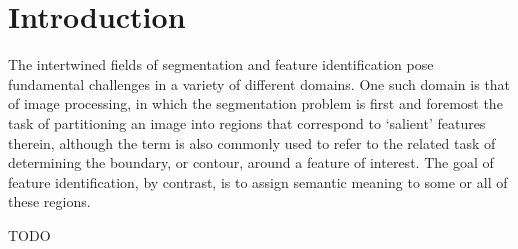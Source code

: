 \chapter{Introduction}
\label{chap:introduction}

The intertwined fields of segmentation and feature identification pose fundamental challenges in a variety of different domains. One such domain is that of image processing, in which the segmentation problem is first and foremost the task of partitioning an image into regions that correspond to `salient' features therein, although the term is also commonly used to refer to the related task of determining the boundary, or contour, around a feature of interest. The goal of feature identification, by contrast, is to assign semantic meaning to some or all of these regions.

TODO
